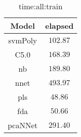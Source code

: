 \begin{table}[!ht]
	\centering
	\begin{tabular}{|c|c|}
		\hline
		Model & elapsed \\ \hline
		svmPoly & $102.87$ \\ \hline
		C5.0 & $168.39$ \\ \hline
		nb & $189.80$ \\ \hline
		nnet & $493.97$ \\ \hline
		pls & $48.86$ \\ \hline
		fda & $50.66$ \\ \hline
		pcaNNet & $291.40$ \\ \hline
	\end{tabular}
	\caption{time:all:train}
	\label{tab:time:all:train}
\end{table}
